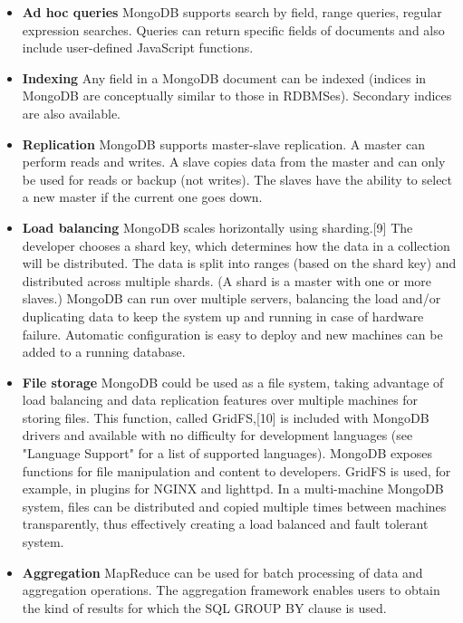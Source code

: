 \begin{itemize}

\item \textbf{Ad hoc queries} 
MongoDB supports search by field, range queries, regular expression searches. Queries can return specific fields of documents and also include user-defined JavaScript functions.

\item \textbf{Indexing} 
Any field in a MongoDB document can be indexed (indices in MongoDB are conceptually similar to those in RDBMSes). Secondary indices are also available.

\item \textbf{Replication} 
MongoDB supports master-slave replication. A master can perform reads and writes. A slave copies data from the master and can only be used for reads or backup (not writes). The slaves have the ability to select a new master if the current one goes down.

\item \textbf{Load balancing} 
MongoDB scales horizontally using sharding.[9] The developer chooses a shard key, which determines how the data in a collection will be distributed. The data is split into ranges (based on the shard key) and distributed across multiple shards. (A shard is a master with one or more slaves.)
MongoDB can run over multiple servers, balancing the load and/or duplicating data to keep the system up and running in case of hardware failure. Automatic configuration is easy to deploy and new machines can be added to a running database.

\item \textbf{File storage} 
MongoDB could be used as a file system, taking advantage of load balancing and data replication features over multiple machines for storing files.
This function, called GridFS,[10] is included with MongoDB drivers and available with no difficulty for development languages (see "Language Support" for a list of supported languages). MongoDB exposes functions for file manipulation and content to developers. GridFS is used, for example, in plugins for NGINX and lighttpd. In a multi-machine MongoDB system, files can be distributed and copied multiple times between machines transparently, thus effectively creating a load balanced and fault tolerant system.

\item \textbf{Aggregation} 
MapReduce can be used for batch processing of data and aggregation operations. The aggregation framework enables users to obtain the kind of results for which the SQL GROUP BY clause is used.


\end{itemize}
